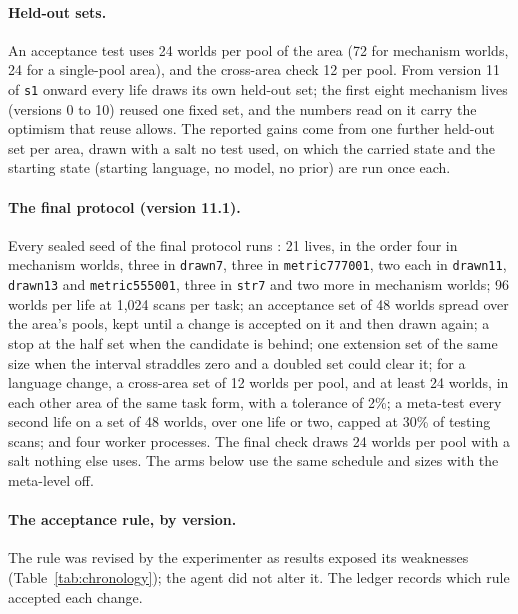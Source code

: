 \documentclass[11pt]{article}
\begin{document}
\paragraph{Held-out sets.} An acceptance test uses 24 worlds per pool of the area (72 for mechanism worlds, 24 for a single-pool area), and the cross-area check 12 per pool. From version 11 of \texttt{s1} onward every life draws its own held-out set; the first eight mechanism lives (versions 0 to 10) reused one fixed set, and the numbers read on it carry the optimism that reuse allows. The reported gains come from one further held-out set per area, drawn with a salt no test used, on which the carried state and the starting state (starting language, no model, no prior) are run once each.

\paragraph{The final protocol (version 11.1).} Every sealed seed of the final protocol runs : 21 lives, in the order four in mechanism worlds, three in \texttt{drawn7}, three in \texttt{metric777001}, two each in \texttt{drawn11}, \texttt{drawn13} and \texttt{metric555001}, three in \texttt{str7} and two more in mechanism worlds; 96 worlds per life at 1,024 scans per task; an acceptance set of 48 worlds spread over the area's pools, kept until a change is accepted on it and then drawn again; a stop at the half set when the candidate is behind; one extension set of the same size when the interval straddles zero and a doubled set could clear it; for a language change, a cross-area set of 12 worlds per pool, and at least 24 worlds, in each other area of the same task form, with a tolerance of 2\%; a meta-test every second life on a set of 48 worlds, over one life or two, capped at 30\% of testing scans; and four worker processes. The final check draws 24 worlds per pool with a salt nothing else uses. The arms below use the same schedule and sizes with the meta-level off.

\paragraph{The acceptance rule, by version.} The rule was revised by the experimenter as results exposed its weaknesses (Table~\ref{tab:chronology}); the agent did not alter it. The ledger records which rule accepted each change.
\end{document}
